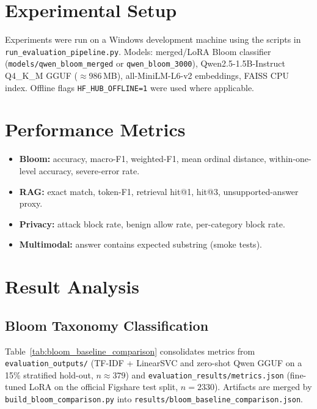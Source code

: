 
\section{Experimental Setup}
Experiments were run on a Windows development machine using the scripts in \texttt{run\_evaluation\_pipeline.py}. Models: merged/LoRA Bloom classifier (\texttt{models/qwen\_bloom\_merged} or \texttt{qwen\_bloom\_3000}), Qwen2.5-1.5B-Instruct Q4\_K\_M GGUF ($\approx$986\,MB), all-MiniLM-L6-v2 embeddings, FAISS CPU index. Offline flags \texttt{HF\_HUB\_OFFLINE=1} were used where applicable.

\section{Performance Metrics}
\begin{itemize}
    \item \textbf{Bloom:} accuracy, macro-F1, weighted-F1, mean ordinal distance, within-one-level accuracy, severe-error rate.
    \item \textbf{RAG:} exact match, token-F1, retrieval hit@1, hit@3, unsupported-answer proxy.
    \item \textbf{Privacy:} attack block rate, benign allow rate, per-category block rate.
    \item \textbf{Multimodal:} answer contains expected substring (smoke tests).
\end{itemize}

\section{Result Analysis}
\subsection{Bloom Taxonomy Classification}
Table~\ref{tab:bloom_baseline_comparison} consolidates metrics from \texttt{evaluation\_outputs/} (TF-IDF + LinearSVC and zero-shot Qwen GGUF on a 15\% stratified hold-out, $n{\approx}379$) and \texttt{evaluation\_results/metrics.json} (fine-tuned LoRA on the official Figshare test split, $n{=}2330$). Artifacts are merged by \texttt{build\_bloom\_comparison.py} into \texttt{results/bloom\_baseline\_comparison.json}.

